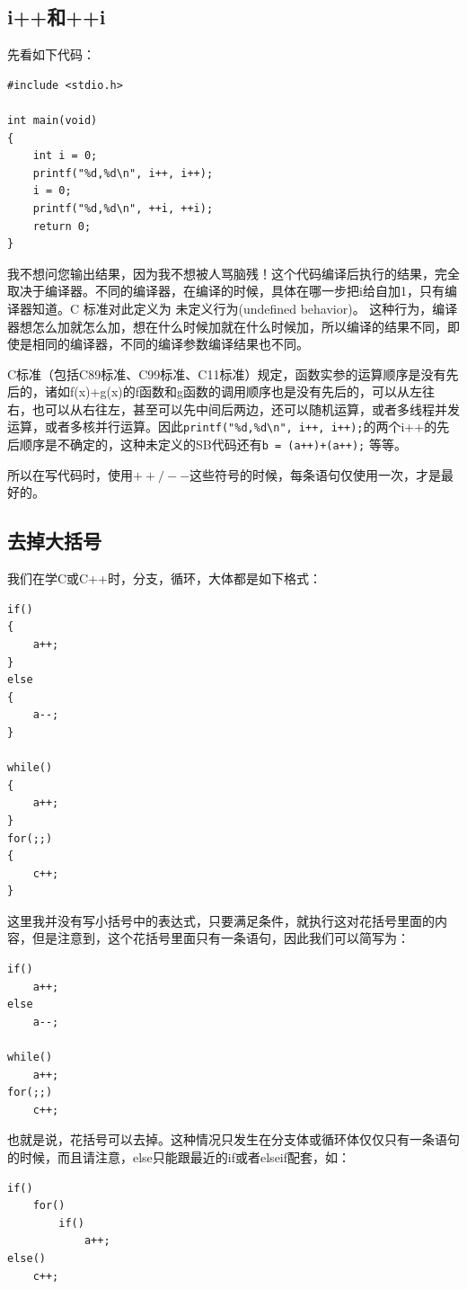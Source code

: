 \documentclass[11pt,twoside,a4paper,titlepage]{article}	%
\newcommand{\kw}[1]{\textcolor[rgb]{0.0,0.0,0.63}{ #1}}
\begin{document}
\subsection{i++和++i}

先看如下代码：
\begin{lstlisting}
#include <stdio.h>

int main(void)
{
	int i = 0;
	printf("%d,%d\n", i++, i++);
	i = 0;
	printf("%d,%d\n", ++i, ++i);
	return 0;
}
\end{lstlisting}

我不想问您输出结果，因为我不想被人骂脑残！这个代码编译后执行的结果，完全取决于编译器。不同的编译器，在编译的时候，具体在哪一步把i给自加1，只有编译器知道。C 标准对此定义为\kw{未定义行为(undefined behavior)}。 这种行为，编译器想怎么加就怎么加，想在什么时候加就在什么时候加，所以编译的结果不同，即使是相同的编译器，不同的编译参数编译结果也不同。

C标准（包括C89标准、C99标准、C11标准）规定，函数实参的运算顺序是没有先后的，诸如f(x)+g(x)的f函数和g函数的调用顺序也是没有先后的，可以从左往右，也可以从右往左，甚至可以先中间后两边，还可以随机运算，或者多线程并发运算，或者多核并行运算。因此\verb|printf("%d,%d\n", i++, i++);|的两个i++的先后顺序是不确定的，这种未定义的SB代码还有\verb|b = (a++)+(a++);| 等等。

所以在写代码时，使用$++/--$这些符号的时候，每条语句仅使用一次，才是最好的。

\subsection{去掉大括号}
我们在学C或C++时，分支，循环，大体都是如下格式：
\begin{lstlisting}
if()
{
	a++;
}
else
{
	a--;
}

while()
{
	a++;
}
for(;;)
{
	c++;
}
\end{lstlisting}

这里我并没有写小括号中的表达式，只要满足条件，就执行这对花括号里面的内容，但是注意到，这个花括号里面只有一条语句，因此我们可以简写为：
\begin{lstlisting}
if()
	a++;
else
	a--;

while()
	a++;
for(;;)
	c++;
\end{lstlisting}

也就是说，花括号可以去掉。这种情况只发生在分支体或循环体仅仅只有一条语句的时候，而且请注意，else只能跟最近的if或者elseif配套，如：
\begin{lstlisting}
if()
	for()
		if()
			a++;
else()
	c++;
\end{lstlisting}
\end{document}
